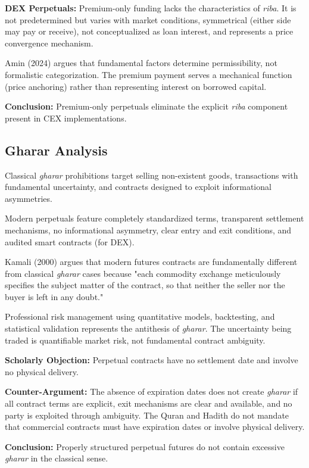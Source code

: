 \documentclass[10pt,twocolumn]{article}
\begin{document}
\textbf{DEX Perpetuals:} Premium-only funding lacks the characteristics of \textit{riba}. It is not predetermined but varies with market conditions, symmetrical (either side may pay or receive), not conceptualized as loan interest, and represents a price convergence mechanism.

Amin (2024) argues that fundamental factors determine permissibility, not formalistic categorization. The premium payment serves a mechanical function (price anchoring) rather than representing interest on borrowed capital.

\textbf{Conclusion:} Premium-only perpetuals eliminate the explicit \textit{riba} component present in CEX implementations.

\subsection{Gharar Analysis}

Classical \textit{gharar} prohibitions target selling non-existent goods, transactions with fundamental uncertainty, and contracts designed to exploit informational asymmetries.

Modern perpetuals feature completely standardized terms, transparent settlement mechanisms, no informational asymmetry, clear entry and exit conditions, and audited smart contracts (for DEX).

Kamali (2000) argues that modern futures contracts are fundamentally different from classical \textit{gharar} cases because "each commodity exchange meticulously specifies the subject matter of the contract, so that neither the seller nor the buyer is left in any doubt."

Professional risk management using quantitative models, backtesting, and statistical validation represents the antithesis of \textit{gharar}. The uncertainty being traded is quantifiable market risk, not fundamental contract ambiguity.

\textbf{Scholarly Objection:} Perpetual contracts have no settlement date and involve no physical delivery.

\textbf{Counter-Argument:} The absence of expiration dates does not create \textit{gharar} if all contract terms are explicit, exit mechanisms are clear and available, and no party is exploited through ambiguity. The Quran and Hadith do not mandate that commercial contracts must have expiration dates or involve physical delivery.

\textbf{Conclusion:} Properly structured perpetual futures do not contain excessive \textit{gharar} in the classical sense.
\end{document}
